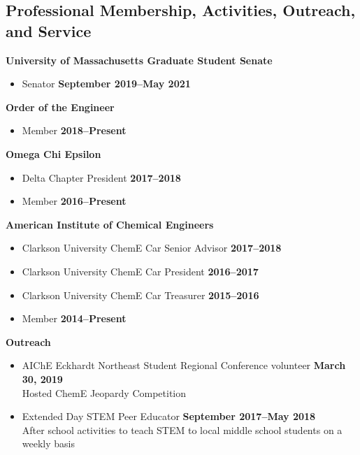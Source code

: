 \documentclass[margin,line]{res}
\begin{document}
\begin{resume}
	\section{\sc Professional Membership, Activities, Outreach, and Service}
	 {\bf University of Massachusetts Graduate Student Senate}
	\vspace*{.05in}
	\begin{itemize}
		\item[ ] Senator \hfill {\bf September 2019--May 2021}
	\end{itemize}
	{\bf Order of the Engineer}
	\vspace*{.05in}
	\begin{itemize}
		\item[ ] Member \hfill {\bf 2018--Present}
	\end{itemize}
	{\bf Omega Chi Epsilon}
	\vspace*{.05in}
	\begin{itemize}
		\item[ ] Delta Chapter President \hfill {\bf 2017--2018}
		\item[ ] Member \hfill {\bf 2016--Present}
	\end{itemize}
	{\bf American Institute of Chemical Engineers}
	\vspace*{.05in}
	\begin{itemize}
		\item[ ] Clarkson University ChemE Car Senior Advisor \hfill {\bf 2017--2018}
		\item[ ] Clarkson University ChemE Car President \hfill {\bf 2016--2017}
		\item[ ] Clarkson University ChemE Car Treasurer \hfill {\bf 2015--2016}
		\item[ ] Member \hfill {\bf 2014--Present}
	\end{itemize}

	\newpage{}
	{\bf Outreach}
	\vspace*{.05in}
	\begin{itemize}

		\item[] AIChE Eckhardt Northeast Student Regional Conference volunteer
		      \hfill {\bf March 30, 2019} \\
		      \hspace*{1em} Hosted ChemE Jeopardy Competition

		\item[] Extended Day STEM Peer Educator
		      \hfill {\bf September 2017--May 2018} \\
		      \hspace*{1em} After school activities to teach STEM to local middle
		      school students on a weekly basis


\end{itemize}
\end{resume}
\end{document}

